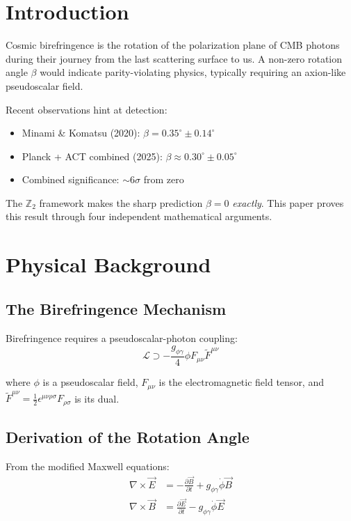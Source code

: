 \documentclass[12pt,a4paper]{article}
\begin{document}
\section{Introduction}

Cosmic birefringence is the rotation of the polarization plane of CMB photons during their journey from the last scattering surface to us. A non-zero rotation angle $\beta$ would indicate parity-violating physics, typically requiring an axion-like pseudoscalar field.

Recent observations hint at detection:
\begin{itemize}
    \item Minami \& Komatsu (2020): $\beta = 0.35^\circ \pm 0.14^\circ$
    \item Planck + ACT combined (2025): $\beta \approx 0.30^\circ \pm 0.05^\circ$
    \item Combined significance: $\sim 6\sigma$ from zero
\end{itemize}

The $\mathbb{Z}_2$ framework makes the sharp prediction $\beta = 0$ \textit{exactly}. This paper proves this result through four independent mathematical arguments.

\section{Physical Background}

\subsection{The Birefringence Mechanism}

Birefringence requires a pseudoscalar-photon coupling:
\begin{equation}
\mathcal{L} \supset -\frac{g_{\phi\gamma}}{4} \phi F_{\mu\nu} \tilde{F}^{\mu\nu}
\label{eq:phiFF}
\end{equation}

where $\phi$ is a pseudoscalar field, $F_{\mu\nu}$ is the electromagnetic field tensor, and $\tilde{F}^{\mu\nu} = \frac{1}{2}\epsilon^{\mu\nu\rho\sigma}F_{\rho\sigma}$ is its dual.

\subsection{Derivation of the Rotation Angle}

From the modified Maxwell equations:
\begin{align}
\nabla \times \vec{E} &= -\frac{\partial \vec{B}}{\partial t} + g_{\phi\gamma} \dot{\phi} \vec{B} \\
\nabla \times \vec{B} &= \frac{\partial \vec{E}}{\partial t} - g_{\phi\gamma} \dot{\phi} \vec{E}
\end{align}
\end{document}
